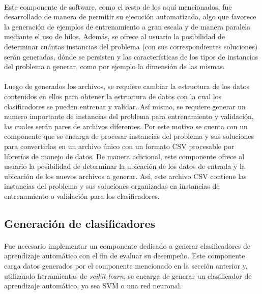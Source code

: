 \paragraph{} Este componente de software, como el resto de los aquí mencionados, fue desarrollado de manera de permitir su ejecución automatizada, algo que favorece la generación de ejemplos de entrenamiento a gran escala y de manera paralela mediante el uso de hilos. Además, se ofrece al usuario la posibilidad de determinar cuántas instancias del problema (con sus correspondientes soluciones) serán generadas, dónde se persisten y las características de los tipos de instancias del problema a generar, como por ejemplo la dimensión de las mismas.

\paragraph{} Luego de generados los archivos, se requiere cambiar la estructura de los datos contenidos en ellos para obtener la estructura de datos con la cual los clasificadores se pueden entrenar y validar. Así mismo, se requiere generar un numero importante de instancias del problema para entrenamiento y validación, las cuales serán pares de archivos diferentes. Por este motivo se cuenta con un componente que se encarga de procesar instancias del problema y sus soluciones para convertirlas en un archivo único con un formato CSV procesable por librerías de manejo de datos. De manera adicional, este componente ofrece al usuario la posibilidad de determinar la ubicación de los datos de entrada y la ubicación de los nuevos archivos a generar. Así, este archivo CSV contiene las instancias del problema y sus soluciones organizadas en instancias de entrenamiento o validación para los clasificadores.

\subsection{Generación de clasificadores}

\paragraph{} Fue necesario implementar un componente dedicado a generar clasificadores de aprendizaje automático con el fin de evaluar su desempeño. Este componente carga datos generados por el componente mencionado en la sección anterior y, utilizando herramientas de \textit{scikit-learn}, se encarga de generar un clasificador de aprendizaje automático, ya sea SVM o una red neuronal. 

